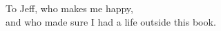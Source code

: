 
\thispagestyle{empty}

\begin{center}
To Jeff, who makes me happy,\\
and who made sure I had a life outside this book.
\end{center}

\setlength{\abovedisplayskip}{-5pt}
\setlength{\abovedisplayshortskip}{-5pt}
